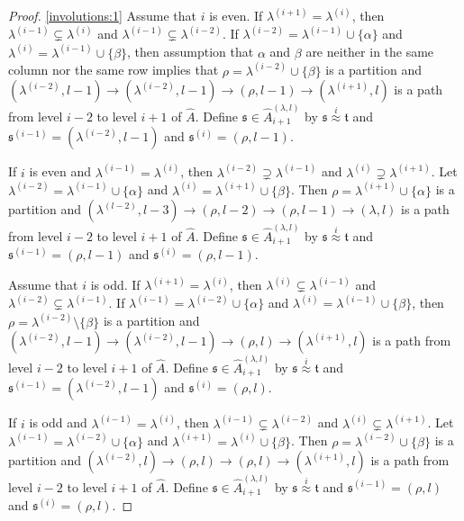 \documentclass[11pt,a4paper,reqno,svgnames]{amsart}
\theoremstyle{plain}
\theoremstyle{definition}
\numberwithin{equation}{section}
\begin{document}
\begin{proof}\eqref{involutions:1}
Assume that $i$ is even. If  $\lambda^{(i+1)}=\lambda^{(i)}$, then $\lambda^{(i-1)}\subsetneq\lambda^{(i)}$ and $\lambda^{(i-1)}\subsetneq\lambda^{(i-2)}$. If $\lambda^{(i-2)}=\lambda^{(i-1)}\cup\lbrace \alpha\rbrace$ and $\lambda^{(i)}=\lambda^{(i-1)}\cup\lbrace \beta\rbrace$, then assumption that $\alpha$ and $\beta$ are neither in the same column nor the same row implies that  $\rho=\lambda^{(i-2)}\cup\lbrace \beta\rbrace$ is a partition and $(\lambda^{(i-2)},l-1)\to (\lambda^{(i-2)},l-1)\to (\rho,l-1)\to (\lambda^{(i+1)},l)$ is a path from level $i-2$ to level $i+1$ of $\hat{A}$. Define $\mathfrak{s}\in \hat{A}_{i+1}^{(\lambda,l)}$ by $\mathfrak{s}\stackrel{i}{\approx}\mathfrak{t}$ and  $\mathfrak{s}^{(i-1)}=(\lambda^{(i-2)},l-1)$ and $\mathfrak{s}^{(i)}=(\rho,l-1)$. 

If $i$ is even and $\lambda^{(i-1)}=\lambda^{(i)}$, then $\lambda^{(i-2)}\supsetneq\lambda^{(i-1)}$ and $\lambda^{(i)}\supsetneq\lambda^{(i+1)}$. Let $\lambda^{(i-2)}=\lambda^{(i-1)}\cup\lbrace \alpha\rbrace$ and $\lambda^{(i)}=\lambda^{(i+1)}\cup \lbrace \beta\rbrace$. Then $\rho=\lambda^{(i+1)}\cup\lbrace \alpha\rbrace$ is a partition and $(\lambda^{(l-2)},l-3)\to (\rho,l-2)\to (\rho,l-1)\to (\lambda,l)$ is a path from level $i-2$ to level $i+1$ of $\hat{A}$. Define $\mathfrak{s}\in \hat{A}_{i+1}^{(\lambda,l)}$ by $\mathfrak{s}\stackrel{i}{\approx}\mathfrak{t}$ and  $\mathfrak{s}^{(i-1)}=(\rho,l-1)$ and $\mathfrak{s}^{(i)}=(\rho,l-1)$.

Assume that $i$ is odd.  If $\lambda^{(i+1)}=\lambda^{(i)}$, then $\lambda^{(i)}\subsetneq\lambda^{(i-1)}$ and $\lambda^{(i-2)}\subsetneq\lambda^{(i-1)}$. If $\lambda^{(i-1)}=\lambda^{(i-2)}\cup\lbrace \alpha\rbrace$ and $\lambda^{(i)}=\lambda^{(i-1)}\cup\lbrace \beta\rbrace$, then $\rho=\lambda^{(i-2)}\setminus \lbrace\beta \rbrace $ is a partition and $(\lambda^{(i-2)},l-1)\to (\lambda^{(i-2)},l-1)\to (\rho,l)\to(\lambda^{(i+1)},l)$ is a path from level $i-2$ to level $i+1$ of $\hat{A}$. Define $\mathfrak{s}\in\hat{A}_{i+1}^{(\lambda,l)}$ by $\mathfrak{s}\stackrel{i}{\approx}\mathfrak{t}$ and $\mathfrak{s}^{(i-1)}=(\lambda^{(i-2)},l-1)$ and $\mathfrak{s}^{(i)}=(\rho,l)$.

If $i$ is odd and $\lambda^{(i-1)}=\lambda^{(i)}$, then $\lambda^{(i-1)}\subsetneq\lambda^{(i-2)}$ and $\lambda^{(i)}\subsetneq\lambda^{(i+1)}$. Let $\lambda^{(i-1)}=\lambda^{(i-2)}\cup\lbrace \alpha\rbrace $ and $\lambda^{(i+1)}=\lambda^{(i)}\cup\lbrace \beta\rbrace$. Then $\rho=\lambda^{(i-2)}\cup\lbrace \beta\rbrace$ is a partition and $(\lambda^{(i-2)},l)\to (\rho,l)\to (\rho,l)\to (\lambda^{(i+1)},l)$ is a path from level $i-2$ to level $i+1$ of $\hat{A}$. Define $\mathfrak{s}\in\hat{A}_{i+1}^{(\lambda,l)}$ by $\mathfrak{s}\stackrel{i}{\approx}\mathfrak{t}$ and $\mathfrak{s}^{(i-1)}=(\rho,l)$ and $\mathfrak{s}^{(i)}=(\rho,l)$. 


\end{proof}
\end{document}
